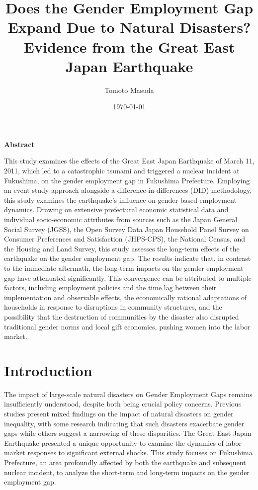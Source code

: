 \documentclass[a4paper,12pt]{article}
\begin{document}
\title{Does the Gender Employment Gap Expand Due to Natural Disasters? Evidence from the Great East Japan Earthquake}

\author{Tomoto Masuda}


\date{\today}

\maketitle

\begin{center}
    \textbf{Abstract}
\end{center}

\noindent
This study examines the effects of the Great East Japan Earthquake of March 11, 2011, which led to a catastrophic tsunami and triggered a nuclear incident at Fukushima, on the gender employment gap in Fukushima Prefecture. Employing an event study approach alongside a difference-in-differences (DID) methodology, this study examines the earthquake's influence on gender-based employment dynamics. Drawing on extensive prefectural economic statistical data and individual socio-economic attributes from sources such as the Japan General Social Survey (JGSS), the Open Survey Data Japan Household Panel Survey on Consumer Preferences and Satisfaction (JHPS-CPS), the National Census, and the Housing and Land Survey, this study assesses the long-term effects of the earthquake on the gender employment gap. The results indicate that, in contrast to the immediate aftermath, the long-term impacts on the gender employment gap have attenuated significantly. This convergence can be attributed to multiple factors, including employment policies and the time lag between their implementation and observable effects, the economically rational adaptations of households in response to disruptions in community structures, and the possibility that the destruction of communities by the disaster also disrupted traditional gender norms and local gift economies, pushing women into the labor market.


\newpage

\tableofcontents


\clearpage
\section{Introduction}
\label{sec1}


The impact of large-scale natural disasters on Gender Employment Gaps remains insufficiently understood, despite both being crucial policy concerns. Previous studies present mixed findings on the impact of natural disasters on gender inequality, with some research indicating that such disasters exacerbate gender gaps while others suggest a narrowing of these disparities. The Great East Japan Earthquake presented a unique opportunity to examine the dynamics of labor market responses to significant external shocks. This study focuses on Fukushima Prefecture, an area profoundly affected by both the earthquake and subsequent nuclear incident, to analyze the short-term and long-term impacts on the gender employment gap.
\end{document}
